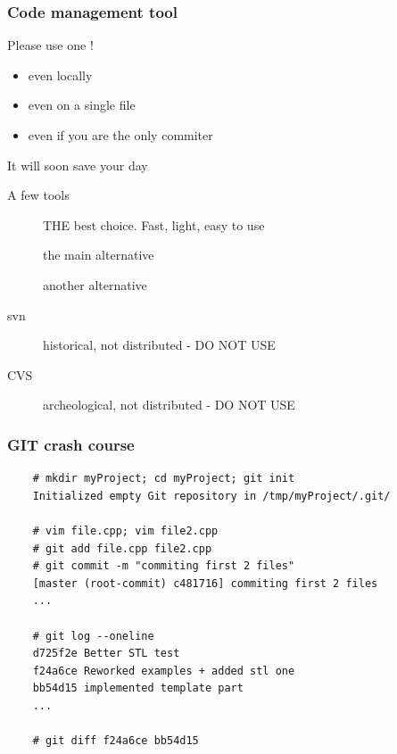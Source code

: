 \begin{frame}[fragile]
  \frametitle{Code management tool}
  \begin{alertblock}{Please use one !}
    \begin{itemize}
    \item even locally
    \item even on a single file
    \item even if you are the only commiter
    \end{itemize}
    It will soon save your day
  \end{alertblock}
  \begin{block}{A few tools}
    \begin{description}
    \item[\href{http://git-scm.com/}{}]
      THE best choice. Fast, light, easy to use
    \item[\href{http://mercurial.selenic.com/}{}]
      the main alternative
    \item[\href{http://bazaar.canonical.com/en/}{}]
      another alternative
    \item[svn]
      historical, not distributed - DO NOT USE
    \item[CVS]
      archeological, not distributed - DO NOT USE
    \end{description}
  \end{block}
\end{frame}

\begin{frame}[fragile]
  \frametitle{GIT crash course}
  \begin{verbatim}
    # mkdir myProject; cd myProject; git init
    Initialized empty Git repository in /tmp/myProject/.git/

    # vim file.cpp; vim file2.cpp
    # git add file.cpp file2.cpp
    # git commit -m "commiting first 2 files"
    [master (root-commit) c481716] commiting first 2 files
    ...

    # git log --oneline
    d725f2e Better STL test
    f24a6ce Reworked examples + added stl one
    bb54d15 implemented template part
    ...

    # git diff f24a6ce bb54d15
  \end{verbatim}
\end{frame}


